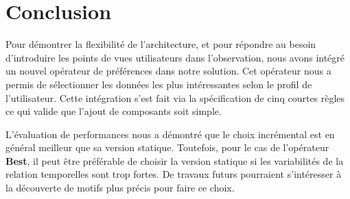 \section{Conclusion}
Pour démontrer la flexibilité de l'architecture, et pour répondre au besoin d'introduire les points de vues utilisateurs dans l'observation, nous avons intégré un nouvel opérateur de préférences dans notre solution. Cet opérateur nous a permis de sélectionner les données les plus intéressantes selon le profil de l'utilisateur. Cette intégration s'est fait via la spécification de cinq courtes règles ce qui valide que l'ajout de composants soit simple.

L'évaluation de performances nous a démontré que le choix incrémental est en général meilleur que sa version statique. Toutefois, pour le cas de l'opérateur \textbf{Best}, il peut être préférable de choisir la version statique si les variabilités de la relation temporelles sont trop fortes. De travaux futurs pourraient s'intéresser à la découverte de motifs plus précis pour faire ce choix.